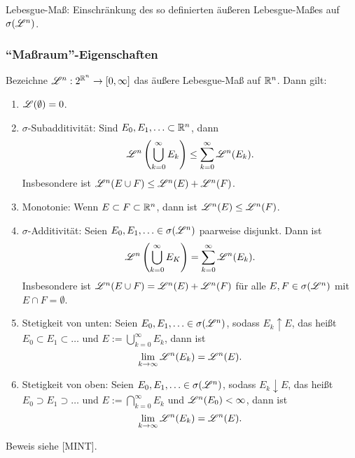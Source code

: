  Lebesgue-Maß: Einschränkung des so definierten äußeren Lebesgue-Maßes auf $\sigma( \mathscr{L}^n )$.
 
\subsubsection{``Maßraum''-Eigenschaften}
\begin{thm}
 Bezeichne $\mathscr{L}^n: 2^{\mathbb{R}^n} \to [0, \infty]$ das äußere Lebesgue-Maß auf $\mathbb{R}^n$. Dann gilt:
 \begin{enumerate}
  \item $\mathscr{L}( \emptyset ) = 0$.
  \item $\sigma$-Subadditivität: Sind $E_0, E_1, \ldots \subset \mathbb{R}^n$, dann
   \[ \mathscr{L}^n \left( \bigcup_{k=0}^\infty E_k \right) \le \sum_{k=0}^\infty \mathscr{L}^n (E_k). \]
   Insbesondere ist $\mathscr{L}^n (E \cup F) \le \mathscr{L}^n (E) + \mathscr{L}^n (F)$.
  \item Monotonie: Wenn $E \subset F \subset \mathbb{R}^n$, dann ist $\mathscr{L}^n (E) \le \mathscr{L}^n (F)$.
  \item $\sigma$-Additivität: Seien $E_0, E_1, \ldots \in \sigma(\mathscr{L}^n)$ paarweise disjunkt. Dann ist
   \[ \mathscr{L}^n \left( \bigcup_{k=0}^\infty E_K \right) = \sum_{k=0}^\infty \mathscr{L}^n (E_k). \]
   Insbesondere ist $\mathscr{L}^n (E \cup F) = \mathscr{L}^n (E) + \mathscr{L}^n (F)$ für alle $E,F \in \sigma(\mathscr{L}^n)$ mit $E \cap F = \emptyset$.
  \item Stetigkeit von unten: Seien $E_0, E_1, \ldots \in \sigma(\mathscr{L}^n)$, sodass $E_k \uparrow E$, das heißt $E_0 \subset E_1 \subset \ldots$ und $E := \bigcup_{k=0}^\infty E_k$, dann ist
   \[ \lim_{k \to \infty} \mathscr{L}^n(E_k) =  \mathscr{L}^n (E). \]
  \item Stetigkeit von oben: Seien $E_0, E_1, \ldots \in \sigma(\mathscr{L}^n)$, sodass $E_k \downarrow E$, das heißt $E_0 \supset E_1 \supset \ldots$ und $E := \bigcap_{k=0}^\infty E_k$ und $\mathscr{L}^n(E_0) < \infty$, dann ist
   \[ \lim_{k \to \infty} \mathscr{L}^n(E_k) =  \mathscr{L}^n (E). \]
 \end{enumerate}
\end{thm}

Beweis siehe [MINT].

